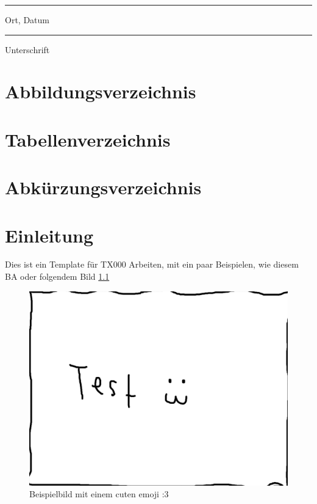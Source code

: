 \documentclass[12pt]{report}
\begin{document}
\vspace{2.5cm}

\parbox{6.5cm}{\hrule\medskip Ort, Datum}  \hfill \parbox{6.5cm}{\hrule\medskip Unterschrift} \hspace{3cm}


\newpage
\chapter*{Abbildungsverzeichnis}

\listoffigures




\newpage
\chapter*{Tabellenverzeichnis}

\listoftables


\newpage
\chapter*{Abkürzungsverzeichnis}

\begin{acronym}[SOAP]
\end{acronym}

\newpage
{}
\chapter{Einleitung}

Dies ist ein Template für TX000 Arbeiten, mit ein paar Beispielen, wie diesem \ac{BA} oder folgendem Bild \ref{fig:example image}

\begin{figure}[h]
	\centering
	\includegraphics[width=0.5 \linewidth]{example}
	\caption{Beispielbild mit einem cuten emoji :3}
	\label{fig:example image}
\end{figure}
\end{document}
